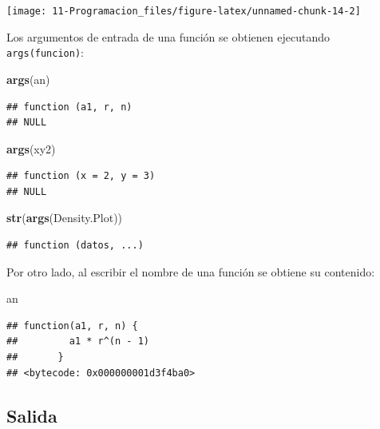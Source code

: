 \documentclass[]{book}
\newenvironment{Shaded}{\begin{snugshade}}{\end{snugshade}}
\newcommand{\KeywordTok}[1]{\textcolor[rgb]{0.13,0.29,0.53}{\textbf{#1}}}
\newcommand{\NormalTok}[1]{#1}
\begin{document}
\begin{center}\texttt{[image: 11-Programacion\_files/figure-latex/unnamed-chunk-14-2]} \end{center}

Los argumentos de entrada de una función se obtienen ejecutando
\texttt{args(funcion)}:

\begin{Shaded}
\begin{Highlighting}[]
\KeywordTok{args}\NormalTok{(an)}
\end{Highlighting}
\end{Shaded}

\begin{verbatim}
## function (a1, r, n) 
## NULL
\end{verbatim}

\begin{Shaded}
\begin{Highlighting}[]
\KeywordTok{args}\NormalTok{(xy2)}
\end{Highlighting}
\end{Shaded}

\begin{verbatim}
## function (x = 2, y = 3) 
## NULL
\end{verbatim}

\begin{Shaded}
\begin{Highlighting}[]
\KeywordTok{str}\NormalTok{(}\KeywordTok{args}\NormalTok{(Density.Plot))}
\end{Highlighting}
\end{Shaded}

\begin{verbatim}
## function (datos, ...)
\end{verbatim}

Por otro lado, al escribir el nombre de una función se obtiene su
contenido:

\begin{Shaded}
\begin{Highlighting}[]
\NormalTok{an}
\end{Highlighting}
\end{Shaded}

\begin{verbatim}
## function(a1, r, n) {
##         a1 * r^(n - 1)
##       }
## <bytecode: 0x000000001d3f4ba0>
\end{verbatim}

\subsection{Salida}\label{salida}
\end{document}
